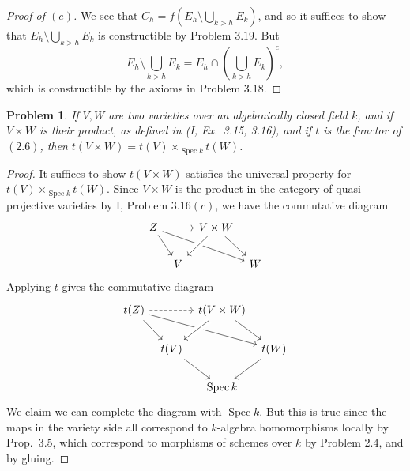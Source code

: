 \documentclass[12pt,letterpaper]{article}
\newtheorem{problem}{Problem}[section]
\theoremstyle{definition}
\theoremstyle{remark}
\numberwithin{equation}{section}
\numberwithin{figure}{problem}
\DeclareMathOperator{\Spec}{Spec}
\begin{document}
\begin{proof}[Proof of $(e)$]
  We see that $C_h = f(E_h \setminus \bigcup_{k > h} E_k)$, and so it suffices to show that $E_h \setminus \bigcup_{k > h} E_k$ is constructible by Problem $3.19$. But
  \begin{equation*}
    E_h \setminus \bigcup_{k > h} E_k = E_h \cap \left(\bigcup_{k > h} E_k\right)^c,
  \end{equation*}
  which is constructible by the axioms in Problem $3.18$.
\end{proof}

\begin{problem}
  If $V,W$ are two varieties over an algebraically closed field $k$, and if $V \times W$ is their product, as defined in \emph{(I, Ex.~3.15, 3.16)}, and if $t$ is the functor of $(2.6)$, then $t(V \times W) = t(V) \times_{\Spec k} t(W)$.
\end{problem}
\begin{proof}
  It suffices to show $t(V \times W)$ satisfies the universal property for $t(V) \times_{\Spec k} t(W)$. Since $V \times W$ is the product in the category of quasi-projective varieties by I, Problem $3.16(c)$, we have the commutative diagram
  \begin{equation*}
    \begin{tikzcd}[column sep=tiny]
      Z \arrow[dashed]{rr}\arrow{drrr}\arrow{dr}& & V \times W\arrow[crossing over]{dl}\arrow{dr}\\
      & V & & W
    \end{tikzcd}
  \end{equation*}
  Applying $t$ gives the commutative diagram
  \begin{equation*}
    \begin{tikzcd}[column sep=tiny]
      t(Z) \arrow[dashed]{rr}\arrow{drrr}\arrow{dr}& & t(V \times W)\arrow[crossing over]{dl}\arrow{dr}\\
      & t(V)\arrow{dr} & & t(W)\arrow{dl}\\
      & & \Spec k
    \end{tikzcd}
  \end{equation*}
  We claim we can complete the diagram with $\Spec k$. But this is true since the maps in the variety side all correspond to $k$-algebra homomorphisms locally by Prop.~3.5, which correspond to morphisms of schemes over $k$ by Problem $2.4$, and by gluing.
\end{proof}

\printbibliography
\end{document}
